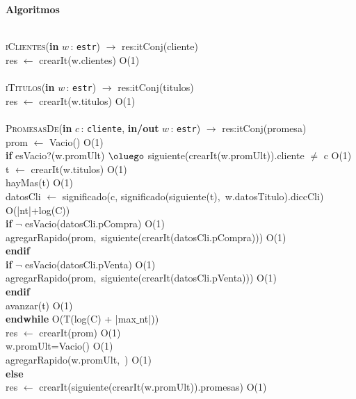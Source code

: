 \documentclass[10pt, a4paper]{article}
\let\NombreFuncion=\textsc
\let\TipoVariable=\texttt
\let\ModificadorArgumento=\textbf
\newcommand{\tab}{\hspace*{7mm}}
\newcommand{\In}[2]{\ModificadorArgumento{in} \ensuremath{#1}\,: \TipoVariable{#2}\xspace}
\newcommand{\Inout}[2]{\ModificadorArgumento{in/out} \ensuremath{#1}\,: \TipoVariable{#2}\xspace}
\newenvironment{Algoritmos}{%
  \vspace*{2ex}%
  \noindent\textbf{\Large Algoritmos}%
  \vspace*{2ex}%
}{}
\begin{document}
\begin{Algoritmos}
\\
\NombreFuncion{iClientes}(\In{w}{estr}) $\rightarrow$ res:itConj(cliente)
\\
\tab res $\leftarrow$ crearIt(w.clientes) \hfill O(1)
\\ \\
\NombreFuncion{iTitulos}(\In{w}{estr}) $\rightarrow$ res:itConj(titulos)
\\
\tab res $\leftarrow$ crearIt(w.titulos) \hfill O(1)
\\ \\
\NombreFuncion{PromesasDe}(\In{c}{cliente}, \Inout{w}{estr}) $\rightarrow$ res:itConj(promesa)
\\
\tab prom $\leftarrow$ Vacio() \hfill O(1)
\\ 
\tab \textbf {if} esVacio?(w.promUlt) $\oluego$ siguiente(crearIt(w.promUlt)).cliente $\neq$ c \hfill O(1)
\\
\tab \tab t $\leftarrow$ crearIt(w.titulos) \hfill O(1)
\\
\tab \tab {while} hayMas(t) \hfill O(1)
\\
\tab \tab \tab datosCli $\leftarrow$ significado(c, significado(siguiente(t),\ w.datosTitulo).diccCli) \hfill O(|nt|+log(C))
\\
\tab \tab \tab \textbf{if} $\neg$ esVacio(datosCli.pCompra) \hfill O(1)
\\
\tab \tab \tab \tab agregarRapido(prom,\ siguiente(crearIt(datosCli.pCompra))) \hfill O(1)
\\
\tab \tab \tab \textbf{endif}
\\
\tab \tab \tab \textbf{if} $\neg$ esVacio(datosCli.pVenta) \hfill O(1)
\\
\tab \tab \tab \tab agregarRapido(prom,\ siguiente(crearIt(datosCli.pVenta))) \hfill O(1)
\\
\tab \tab \tab \textbf{endif} 
\\
\tab \tab \tab avanzar(t) \hfill O(1)
\\
\tab \tab \textbf{endwhile} \hfill O(T(log(C) + |max$\_$nt|))
\\
\tab \tab res $\leftarrow$ crearIt(prom) \hfill O(1)
\\
\tab w.promUlt=Vacio() \hfill O(1)
\\
\tab agregarRapido(w.promUlt,\ <c,prom>) \hfill O(1)
\\
\tab \textbf{else}
\\
\tab \tab res $\leftarrow$ crearIt(siguiente(crearIt(w.promUlt)).promesas) \hfill O(1)
\\

\end{Algoritmos}
\end{document}
